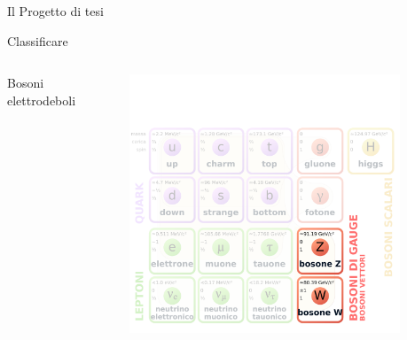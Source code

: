 \documentclass{beamer}
\begin{document}
\begin{frame}{Il Progetto di tesi}
%
%
  \vspace*{-3.5ex}
  \begin{center}
    \Large
    Classificare
  \end{center}
  \vspace*{-1.5ex}
  \begin{columns}[T]
      \begin{block}{}
        \centering%
        Bosoni elettrodeboli
      \end{block}
      \begin{figure}
        \centering
        \includegraphics[width=\textwidth]{./Images/sm_overview-flat.pdf}
      \end{figure}
      \begin{flushleft}
        \vspace{-3ex}
\end{flushleft}
\end{columns}
\end{frame}
\end{document}
